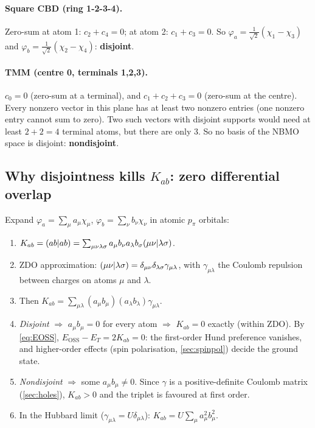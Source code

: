 \paragraph{Square CBD (ring 1-2-3-4).} Zero-sum at atom 1: $c_2+c_4=0$; at atom 2: $c_1+c_3=0$. So
$\varphi_a=\tfrac1{\sqrt2}(\chi_1-\chi_3)$ and $\varphi_b=\tfrac1{\sqrt2}(\chi_2-\chi_4)$: \textbf{disjoint}.

\paragraph{TMM (centre 0, terminals 1,2,3).} $c_0=0$ (zero-sum at a terminal), and $c_1+c_2+c_3=0$ (zero-sum
at the centre). Every nonzero vector in this plane has at least two nonzero entries (one nonzero entry
cannot sum to zero). Two such vectors with disjoint supports would need at least $2+2=4$ terminal
atoms, but there are only 3. So no basis of the NBMO space is disjoint: \textbf{nondisjoint}.

\subsection{Why disjointness kills $K_{ab}$: zero differential overlap}
Expand $\varphi_a=\sum_\mu a_\mu\chi_\mu$, $\varphi_b=\sum_\nu b_\nu\chi_\nu$ in atomic $p_\pi$ orbitals:
\begin{enumerate}
  \item $K_{ab}=(ab\vert ab)=\sum_{\mu\nu\lambda\sigma}a_\mu b_\nu a_\lambda b_\sigma(\mu\nu\vert \lambda\sigma)$.
  \item ZDO approximation: $(\mu\nu\vert \lambda\sigma)=\delta_{\mu\nu}\delta_{\lambda\sigma}\gamma_{\mu\lambda}$, with $\gamma_{\mu\lambda}$ the
        Coulomb repulsion between charges on atoms $\mu$ and $\lambda$.
  \item Then $K_{ab}=\sum_{\mu\lambda}(a_\mu b_\mu)(a_\lambda b_\lambda)\gamma_{\mu\lambda}$.
  \item \emph{Disjoint} $\Rightarrow$ $a_\mu b_\mu=0$ for every atom $\Rightarrow$ $K_{ab}=0$ exactly (within ZDO).
        By \cref{eq:EOSS}, $E_{\text{OSS}}-E_T=2K_{ab}=0$: the first-order Hund preference vanishes, and
        higher-order effects (spin polarisation, \cref{sec:spinpol}) decide the ground state.
  \item \emph{Nondisjoint} $\Rightarrow$ some $a_\mu b_\mu\neq0$. Since $\gamma$ is a positive-definite Coulomb
        matrix (\cref{sec:holes}), $K_{ab}>0$ and the triplet is favoured at first order.
  \item In the Hubbard limit ($\gamma_{\mu\lambda}=U\delta_{\mu\lambda}$): $K_{ab}=U\sum_\mu a_\mu^2b_\mu^2$.
\end{enumerate}

